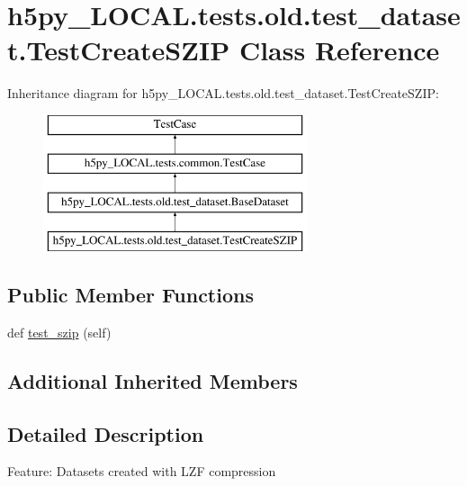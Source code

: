 \hypertarget{classh5py__LOCAL_1_1tests_1_1old_1_1test__dataset_1_1TestCreateSZIP}{}\section{h5py\+\_\+\+L\+O\+C\+A\+L.\+tests.\+old.\+test\+\_\+dataset.\+Test\+Create\+S\+Z\+IP Class Reference}
\label{classh5py__LOCAL_1_1tests_1_1old_1_1test__dataset_1_1TestCreateSZIP}
Inheritance diagram for h5py\+\_\+\+L\+O\+C\+A\+L.\+tests.\+old.\+test\+\_\+dataset.\+Test\+Create\+S\+Z\+IP\+:\begin{figure}[H]
\begin{center}
\leavevmode
\includegraphics[height=4.000000cm]{classh5py__LOCAL_1_1tests_1_1old_1_1test__dataset_1_1TestCreateSZIP}
\end{center}
\end{figure}
\subsection*{Public Member Functions}
\begin{DoxyCompactItemize}
\item 
def \hyperlink{classh5py__LOCAL_1_1tests_1_1old_1_1test__dataset_1_1TestCreateSZIP_a3d7d0d58e015196e82f8b82e1aa91528}{test\+\_\+szip} (self)
\end{DoxyCompactItemize}
\subsection*{Additional Inherited Members}


\subsection{Detailed Description}
\begin{DoxyVerb}    Feature: Datasets created with LZF compression
\end{DoxyVerb}
 

